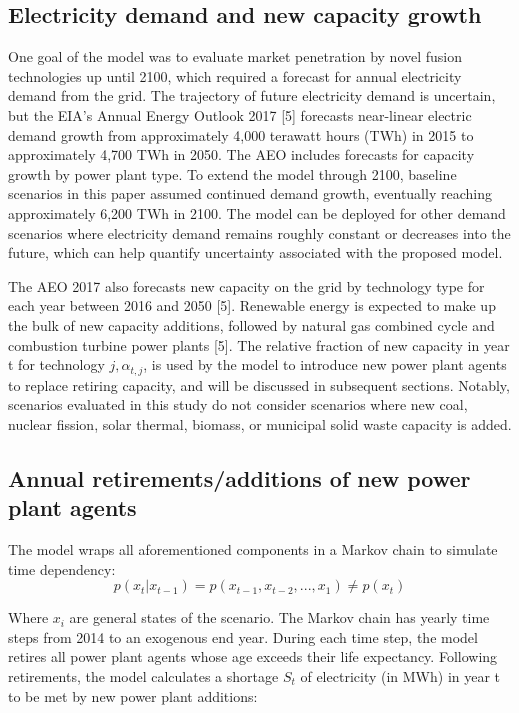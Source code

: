 \documentclass[preprint, 12pt]{elsarticle}
\begin{document}
\subsection{Electricity demand and new capacity growth}


One goal of the model was to evaluate market penetration by novel fusion technologies up until 2100, which required a forecast for annual electricity demand from the grid. The trajectory of future electricity demand is uncertain, but the EIA’s Annual Energy Outlook 2017 [5] forecasts near-linear electric demand growth from approximately 4,000 terawatt hours (TWh) in 2015 to approximately 4,700 TWh in 2050. The AEO includes forecasts for capacity growth by power plant type. To extend the model through 2100, baseline scenarios in this paper assumed continued demand growth, eventually reaching approximately 6,200 TWh in 2100. The model can be deployed for other demand scenarios where electricity demand remains roughly constant or decreases into the future, which can help quantify uncertainty associated with the proposed model.

The AEO 2017 also forecasts new capacity on the grid by technology type for each year between 2016 and 2050 [5]. Renewable energy is expected to make up the bulk of new capacity additions, followed by natural gas combined cycle and combustion turbine power plants [5]. The relative fraction of new capacity in year t for technology $j, α_{t,j}$, is used by the model to introduce new power plant agents to replace retiring capacity, and will be discussed in subsequent sections. Notably, scenarios evaluated in this study do not consider scenarios where new coal, nuclear fission, solar thermal, biomass, or municipal solid waste capacity is added.


\subsection{Annual retirements/additions of new power plant agents}

The model wraps all aforementioned components in a Markov chain to simulate time dependency: 
$$ p(x_t|x_{t-1})=p(x_{t-1},x_{t-2},...,x_1)\neq p(x_t)$$

Where $x_i$ are general states of the scenario. The Markov chain has yearly time steps from 2014 to an exogenous end year. During each time step, the model retires all power plant agents whose age exceeds their life expectancy. Following retirements, the model calculates a shortage $S_t$ of electricity (in MWh) in year t to be met by new power plant additions:
\end{document}
